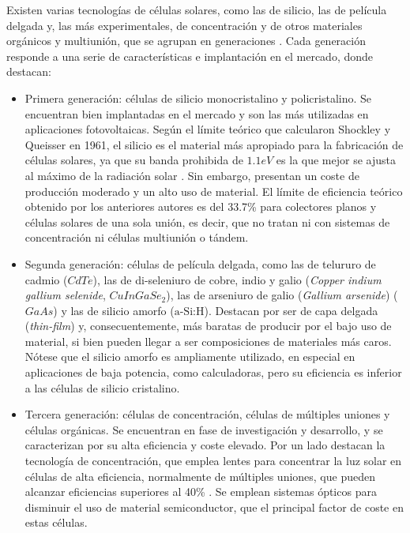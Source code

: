 Existen varias tecnologías de células solares, como las de silicio, las de película delgada y, las más experimentales, de concentración y de otros materiales orgánicos y multiunión, que se agrupan en generaciones \cite{Shubbak_2019}. Cada generación responde a una serie de características e implantación en el mercado, donde destacan:

\begin{itemize}
      \item Primera generación: células de silicio monocristalino y policristalino.
            Se encuentran bien implantadas en el mercado y son las más utilizadas en aplicaciones fotovoltaicas. Según el límite teórico que calcularon Shockley y Queisser en 1961, el silicio es el material más apropiado para la fabricación de células solares, ya que su banda prohibida de $1.1 eV$ es la que mejor se ajusta al máximo de la radiación solar \cite[][p. 1126]{böer2002survey}. Sin embargo, presentan un coste de producción moderado y un alto uso de material. El límite de eficiencia teórico obtenido por los anteriores autores es del 33.7\% \cite{Shockley_Queisser_1961} para colectores planos y células solares de una sola unión, es decir, que no tratan ni con sistemas de concentración ni células multiunión o tándem.
      \item Segunda generación: células de película delgada, como las de telururo de cadmio ($CdTe$), las de di-seleniuro de cobre, indio y galio (\textit{Copper indium gallium selenide}, $CuInGaSe_2$), las de arseniuro de galio (\textit{Gallium arsenide}) ($GaAs$) y las de silicio amorfo ($\text{a-Si:H}$).
            Destacan por ser de capa delgada (\textit{thin-film}) y, consecuentemente, más baratas de producir por el bajo uso de material, si bien pueden llegar a ser composiciones de materiales más caros.
            Nótese que el silicio amorfo es ampliamente utilizado, en especial en aplicaciones de baja potencia, como calculadoras, pero su eficiencia es inferior a las células de silicio cristalino.
      \item Tercera generación: células de concentración, células de múltiples uniones y células orgánicas.
            Se encuentran en fase de investigación y desarrollo, y se caracterizan por su alta eficiencia y coste elevado.
            Por un lado destacan la tecnología de concentración, que emplea lentes para concentrar la luz solar en células de alta eficiencia, normalmente de múltiples uniones, que pueden alcanzar eficiencias superiores al 40\% \cite[][Tabla 5]{Green_Dunlop_Yoshita_Kopidakis_Bothe_Siefer_Hao_2024}. Se emplean sistemas ópticos para disminuir el uso de material semiconductor, que el principal factor de coste en estas células.
\end{itemize}

